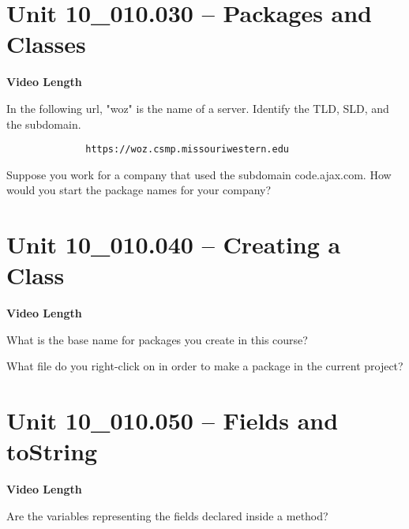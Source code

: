 \documentclass[letterpaper,12pt]{exam}
\newcommand{\unit}{Unit 10}
\begin{document}
\begin{questions}
\section*{\unit\_010.030 -- Packages and Classes} 
\par{\selectfont\textbf{Video Length }}

\begin{samepage}
    \question In the following url, "woz" is the name of a server.  Identify the TLD, SLD, and the subdomain.
    \begin{verbatim}
              https://woz.csmp.missouriwestern.edu
    \end{verbatim}
    \vspace{5mm}
\end{samepage}

\begin{samepage}
    \question Suppose you work for a company that used the subdomain code.ajax.com.  How would you start the package names for your company?
    \vspace{5mm}
\end{samepage}


\section*{\unit\_010.040 -- Creating a Class} 
\par{\selectfont\textbf{Video Length }}

\begin{samepage}
    \question What is the base name for packages you create in this course?
    \vspace{5mm}
\end{samepage}

\begin{samepage}
    \question What file do you right-click on in order to make a package in the current project?
    \vspace{5mm}
\end{samepage}


\section*{\unit\_010.050 -- Fields and toString} 
\par{\selectfont\textbf{Video Length }}

\begin{samepage}
    \question Are the variables representing the fields declared inside a method?


\end{samepage}
\end{questions}
\end{document}
